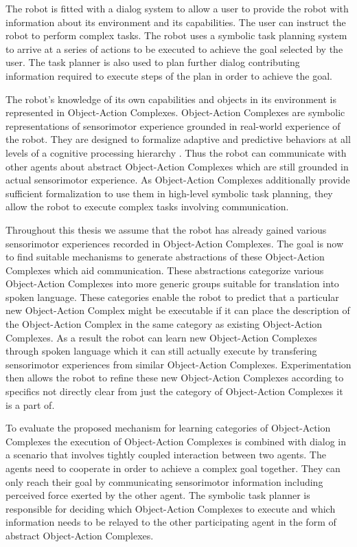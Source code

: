 \documentclass[english,ngerman]{KITreprt}
\begin{document}
The robot is fitted with a dialog system to allow a user to provide the robot
with information about its environment and its capabilities. The user can
instruct the robot to perform complex tasks. The robot uses a symbolic task
planning system to arrive at a series of actions to be executed to achieve the
goal selected by the user. The task planner is also used to plan further dialog
contributing information required to execute steps of the plan in order to
achieve the goal.

The robot's knowledge of its own capabilities and objects in its environment is
represented in Object-Action Complexes. Object-Action Complexes are symbolic
representations of sensorimotor experience grounded in real-world experience of
the robot. They are designed to formalize adaptive and predictive behaviors at
all levels of a cognitive processing hierarchy \cite{Geib2011}. Thus the robot can
communicate with other agents about abstract Object-Action Complexes which are
still grounded in actual sensorimotor experience. As Object-Action Complexes
additionally provide sufficient formalization to use them in high-level symbolic
task planning, they allow the robot to execute complex tasks involving
communication.

Throughout this thesis we assume that the robot has already gained various
sensorimotor experiences recorded in Object-Action Complexes. The goal is now to
find suitable mechanisms to generate abstractions of these Object-Action
Complexes which aid communication. These abstractions categorize various
Object-Action Complexes into more generic groups suitable for translation into
spoken language. These categories enable the robot to predict that a particular
new Object-Action Complex might be executable if it can place the description
of the Object-Action Complex in the same category as existing Object-Action
Complexes. As a result the robot can learn new Object-Action Complexes through
spoken language which it can still actually execute by transfering sensorimotor
experiences from similar Object-Action Complexes. Experimentation then allows
the robot to refine these new Object-Action Complexes according to specifics
not directly clear from just the category of Object-Action Complexes it is a
part of.

To evaluate the proposed mechanism for learning categories of Object-Action
Complexes the execution of Object-Action Complexes is combined with
dialog in a scenario that involves tightly coupled interaction between two
agents. The agents need to cooperate in order to achieve a complex goal
together. They can only reach their goal by communicating sensorimotor
information including perceived force exerted by the other agent. The symbolic
task planner is responsible for deciding which Object-Action Complexes to
execute and which information needs to be relayed to the other participating
agent in the form of abstract Object-Action Complexes.
\end{document}
